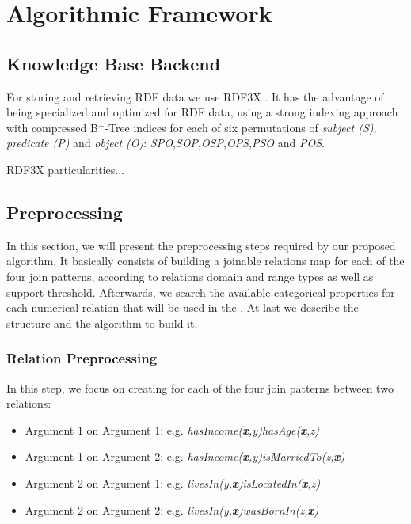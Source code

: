 \chapter{Algorithmic Framework}
\label{af:intro}

\section{Knowledge Base Backend}

For storing and retrieving RDF data we use RDF3X \cite{Neumann:2010:RES:1731351.1731354}. It has the advantage of being specialized and optimized for RDF data, using a strong indexing approach with compressed B$^+$-Tree indices for each of six permutations of \emph{subject (S)}, \emph{predicate (P)} and \emph{object (O)}: \emph{SPO},\emph{SOP},\emph{OSP},\emph{OPS},\emph{PSO} and \emph{POS}.

RDF3X particularities...

\section{Preprocessing}

In this section, we will present the preprocessing steps required by our proposed algorithm. It basically consists of building a joinable relations map for each of the four join patterns, according to relations domain and range types as well as support threshold. Afterwards, we search the available categorical properties for each numerical relation that will be used in the \graphname. At last we describe the \graphname structure and the algorithm to build it.

\subsection{Relation Preprocessing}

In this step, we focus on creating for each of the four join patterns between two relations:

\begin{itemize}
 \item Argument 1 on Argument 1: e.g. \emph{hasIncome(\textbf{x},y)hasAge(\textbf{x},z)}
 \item Argument 1 on Argument 2: e.g. \emph{hasIncome(\textbf{x},y)isMarriedTo(z,\textbf{x})}
 \item Argument 2 on Argument 1: e.g. \emph{livesIn(y,\textbf{x})isLocatedIn(\textbf{x},z)}
 \item Argument 2 on Argument 2: e.g. \emph{livesIn(y,\textbf{x})wasBornIn(z,\textbf{x})}
\end{itemize}

